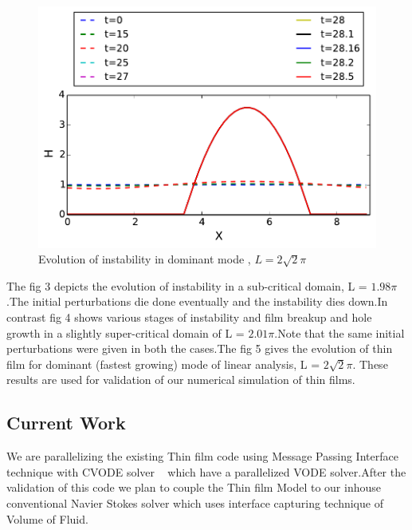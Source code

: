 \documentclass[
manuscript=article]{achemso}
\begin{document}
\begin{center}
  \begin{figure}[h!]
 \includegraphics[]{2_2pi.pdf}
 \caption{Evolution of instability in dominant mode  , $ L = 2 \sqrt{2} \pi $ } \label{fig:impinge}
\end{figure}
\end{center}


The fig 3 depicts the evolution of instability in a sub-critical domain, L = $ 1.98 \pi $.The initial perturbations die done eventually and the instability dies down.In contrast fig 4 shows various stages of instability and film breakup and hole growth in a slightly super-critical domain of L = $ 2.01 \pi $.Note that the same initial perturbations were given in both the cases.The fig 5 gives the evolution of thin film for dominant (fastest growing) mode of linear analysis, L = $ 2 \sqrt{2} \pi $. These results are used for validation of our numerical simulation of thin films.~\cite{12}


\subsection{Current Work}

We are  parallelizing the existing Thin film code using Message Passing Interface technique with CVODE solver ~\cite{14} which have a  parallelized VODE solver.After the validation of this code we plan to couple the Thin film Model to our inhouse  conventional Navier Stokes solver which uses interface capturing technique of Volume of Fluid.  







\clearpage


\end{document}
